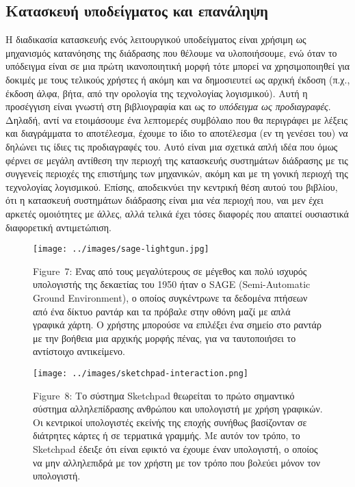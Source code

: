 \documentclass[
]{article}
\begin{document}
\hypertarget{ux3baux3b1ux3c4ux3b1ux3c3ux3baux3b5ux3c5ux3ae-ux3c5ux3c0ux3bfux3b4ux3b5ux3afux3b3ux3bcux3b1ux3c4ux3bfux3c2-ux3baux3b1ux3b9-ux3b5ux3c0ux3b1ux3bdux3acux3bbux3b7ux3c8ux3b7}{%
\subsection{Κατασκευή υποδείγματος και
επανάληψη}\label{ux3baux3b1ux3c4ux3b1ux3c3ux3baux3b5ux3c5ux3ae-ux3c5ux3c0ux3bfux3b4ux3b5ux3afux3b3ux3bcux3b1ux3c4ux3bfux3c2-ux3baux3b1ux3b9-ux3b5ux3c0ux3b1ux3bdux3acux3bbux3b7ux3c8ux3b7}}

Η διαδικασία κατασκευής ενός λειτουργικού υποδείγματος είναι χρήσιμη ως
μηχανισμός κατανόησης της διάδρασης που θέλουμε να υλοποιήσουμε, ενώ
όταν το υπόδειγμα είναι σε μια πρώτη ικανοποιητική μορφή τότε μπορεί να
χρησιμοποιηθεί για δοκιμές με τους τελικούς χρήστες ή ακόμη και να
δημοσιευτεί ως αρχική έκδοση (π.χ., έκδοση άλφα, βήτα, από την ορολογία
της τεχνολογίας λογισμικού). Αυτή η προσέγγιση είναι γνωστή στη
βιβλιογραφία και ως \emph{το υπόδειγμα ως προδιαγραφές}. Δηλαδή, αντί να
ετοιμάσουμε ένα λεπτομερές συμβόλαιο που θα περιγράφει με λέξεις και
διαγράμματα το αποτέλεσμα, έχουμε το ίδιο το αποτέλεσμα (εν τη γενέσει
του) να δηλώνει τις ίδιες τις προδιαγραφές του. Αυτό είναι μια σχετικά
απλή ιδέα που όμως φέρνει σε μεγάλη αντίθεση την περιοχή της κατασκευής
συστημάτων διάδρασης με τις συγγενείς περιοχές της επιστήμης των
μηχανικών, ακόμη και με τη γονική περιοχή της τεχνολογίας λογισμικού.
Επίσης, αποδεικνύει την κεντρική θέση αυτού του βιβλίου, ότι η κατασκευή
συστημάτων διάδρασης είναι μια νέα περιοχή που, ναι μεν έχει αρκετές
ομοιότητες με άλλες, αλλά τελικά έχει τόσες διαφορές που απαιτεί
ουσιαστικά διαφορετική αντιμετώπιση.

\leavevmode{}%
\begin{figure}
\hypertarget{fig:sage-lightgun}{%
\centering
\texttt{[image: ../images/sage-lightgun.jpg]}
\caption{Figure~7: Ένας από τους μεγαλύτερους σε μέγεθος και πολύ
ισχυρός υπολογιστής της δεκαετίας του 1950 ήταν ο SAGE (Semi-Automatic
Ground Environment), ο οποίος συγκέντρωνε τα δεδομένα πτήσεων από ένα
δίκτυο ραντάρ και τα πρόβαλε στην οθόνη μαζί με απλά γραφικά χάρτη. Ο
χρήστης μπορούσε να επιλέξει ένα σημείο στο ραντάρ με την βοήθεια μια
αρχικής μορφής πένας, για να ταυτοποιήσει το αντίστοιχο
αντικείμενο.}\label{fig:sage-lightgun}
}
\end{figure}

\leavevmode{}%
\begin{figure}
\hypertarget{fig:sketchpad-interaction}{%
\centering
\texttt{[image: ../images/sketchpad-interaction.png]}
\caption{Figure~8: Το σύστημα Sketchpad θεωρείται το πρώτο σημαντικό
σύστημα αλληλεπίδρασης ανθρώπου και υπολογιστή με χρήση γραφικών. Οι
κεντρικοί υπολογιστές εκείνής της εποχής συνήθως βασίζονταν σε διάτρητες
κάρτες ή σε τερματικά γραμμής. Με αυτόν τον τρόπο, το Sketchpad έδειξε
ότι είναι εφικτό να έχουμε έναν υπολογιστή, ο οποίος να μην αλληλεπιδρά
με τον χρήστη με τον τρόπο που βολεύει μόνον τον
υπολογιστή.}\label{fig:sketchpad-interaction}
}
\end{figure}
\end{document}
